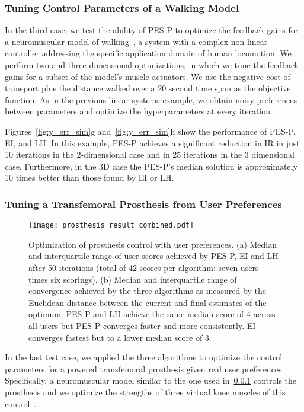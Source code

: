 \subsubsection{Tuning Control Parameters of a Walking Model
    }\label{sec:sim_neuro}
In the third case, we test the ability of PES-P to optimize the feedback gains
for a neuromuscular model of walking~\citep{thatte2016toward}, a system with a
complex non-linear controller addressing the specific application domain of
human locomotion. We perform two and three dimensional optimizations, in which
we tune the feedback gains for a subset of the model's muscle actuators.  We use
the negative cost of transport plus the distance walked over a 20 second time
span as the objective function. As in the previous linear systems example, we
obtain noisy preferences between parameters and optimize the hyperparameters at
every iteration.

Figures~\ref{fig:y_err_sim}g and~\ref{fig:y_err_sim}h show the performance of
PES-P, EI, and LH\@. In this example, PES-P achieves a significant reduction in
IR in just 10 iterations in the 2-dimensional case and in 25 iterations in the 3
dimensional case.  Furthermore, in the 3D case the PES-P's median solution is
approximately 10 times better than those found by EI or LH\@. 

\subsubsection{Tuning a Transfemoral Prosthesis from User Preferences} 
\begin{figure*}[t]
    \centering
    \texttt{[image: prosthesis\_result\_combined.pdf]}
    \caption{Optimization of prosthesis control with user preferences. (a)
    Median and interquartile range of user scores achieved by PES-P, EI and LH
    after 50 iterations (total of 42 scores per algorithm: seven users times six
    scorings). (b) Median and interquartile range of convergence achieved by the
    three algorithms as measured by the Euclidean distance between the current
    and final estimates of the optimum. PES-P and LH achieve the same median
    score of 4 across all users but PES-P converges faster and more
    consistently. EI converges fastest but to a lower median score of
    3.}\label{fig:prosthesis_result}
\end{figure*}


In the last test case, we applied the three algorithms to optimize the control
parameters for a powered transfemoral prosthesis given real user preferences.
Specifically, a neuromuscular model similar to the one used
in~\cref{sec:sim_neuro} controls the prosthesis and we optimize the strengths
of three virtual knee muscles of this control~\citep{thatte2016toward}. 

